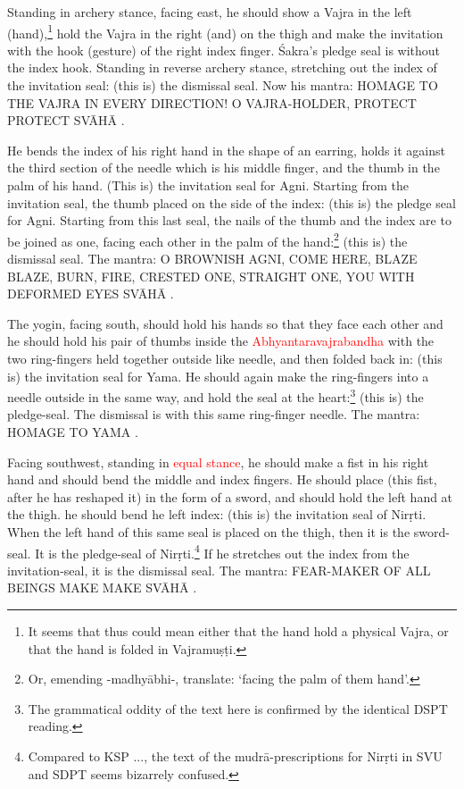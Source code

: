 \documentclass[11pt]{book}
\makeatletter
\def\fakesc#1{%
  \begingroup%
  \xdef\fake@name{\csname\curr@fontshape/\f@size\endcsname}%
  \fontsize{1.3\fontdimen8\fake@name}{\baselineskip}\selectfont%
  \uppercase{#1}%
  \endgroup%
}
\newcommand{\mantra}[1]{\fakesc{#1}}
\newcommand{\red}[1]{\textcolor{red}{#1}}
\makeatother
\begin{document}
Standing in archery stance, facing east, he should show a Vajra in the left (hand),\footnote{It seems that thus could mean either that the hand hold a physical Vajra, or that the hand is folded in Vajramuṣṭi.} hold the Vajra in the right (and) on the thigh and make the invitation with the hook (gesture) of the right index finger. Śakra's pledge seal is without the index hook. Standing in reverse archery stance, stretching out the index of the invitation seal: (this is) the dismissal seal. Now his mantra: \mantra{homage to the Vajra in every direction! o Vajra-holder, protect protect svāhā}.

He bends the index of his right hand in the shape of an earring, holds it against the third section of the needle which is his middle finger, and the thumb in the palm of his hand. (This is) the invitation seal for Agni. Starting from the invitation seal, the thumb placed on the side of the index: (this is) the pledge seal for Agni. Starting from this last seal, the nails of the thumb and the index are to be joined as one, facing each other in the palm of the hand:\footnote{Or, emending -madhyābhi-, translate: `facing the palm of them hand'.} (this is) the dismissal seal. The mantra: \mantra{o brownish agni, come here, blaze blaze, burn, fire, crested one, straight one, you with deformed eyes svāhā}.

The yogin, facing south, should hold his hands so that they face each other and he should hold his pair of thumbs inside the \red{Abhyantaravajrabandha} with the two ring-fingers held together outside like needle, and then folded back in: (this is) the invitation seal for Yama. He should again make the ring-fingers into a needle outside in the same way, and hold the seal at the heart:\footnote{The grammatical oddity of the text here is confirmed by the identical DSPT reading.} (this is) the pledge-seal. The dismissal is with this same ring-finger needle. The mantra: \mantra{homage to Yama}.

Facing southwest, standing in \red{equal stance}, he should make a fist in his right hand and should bend the middle and index fingers. He should place (this fist, after he has reshaped it) in the form of a sword, and should hold the left hand at the thigh. he should bend he left index: (this is) the invitation seal of Nirṛti. When the left hand of this same seal is placed on the thigh, then it is the sword-seal. It is the pledge-seal of Nirṛti.\footnote{Compared to KSP ..., the text of the mudrā-prescriptions for Nirṛti in SVU and SDPT seems bizarrely confused.} If he stretches out the index from the invitation-seal, it is the dismissal seal. The mantra: \mantra{fear-maker of all beings make make svāhā}.
\end{document}
